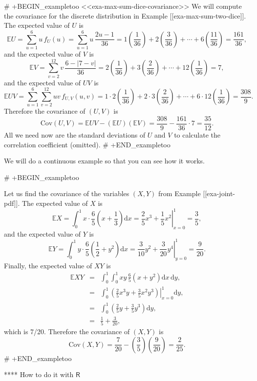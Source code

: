# +BEGIN_exampletoo
<<exa-max-sum-dice-covariance>> We will compute the covariance for the
discrete distribution in Example [[exa-max-sum-two-dice]]. The expected
value of \(U\) is \[ \mathbb{E} U=\sum_{u=1}^{6}u\,
f_{U}(u)=\sum_{u=1}^{6}u\,\frac{2u-1}{36}=1\left(\frac{1}{36}\right)+2\left(\frac{3}{36}\right)+\cdots+6\left(\frac{11}{36}\right)=\frac{161}{36},
\] and the expected value of \(V\) is \[ \mathbb{E}
V=\sum_{v=2}^{12}v\,\frac{6-|7-v|}{36}=2\left(\frac{1}{36}\right)+3\left(\frac{2}{36}\right)+\cdots+12\left(\frac{1}{36}\right)=7,
\] and the expected value of \(UV\) is \[ \mathbb{E}
UV=\sum_{u=1}^{6}\sum_{v=2}^{12}uv\,
f_{U,V}(u,v)=1\cdot2\left(\frac{1}{36}\right)+2\cdot3\left(\frac{2}{36}\right)+\cdots+6\cdot12\left(\frac{1}{36}\right)=\frac{308}{9}.
\] Therefore the covariance of \((U,V)\) is \[
\mbox{Cov}(U,V)=\mathbb{E} UV-\left(\mathbb{E}
U\right)\left(\mathbb{E}
V\right)=\frac{308}{9}-\frac{161}{36}\cdot7=\frac{35}{12}.  \] All we
need now are the standard deviations of \(U\) and \(V\) to calculate
the correlation coefficient (omitted).
# +END_exampletoo


We will do a continuous example so that you can see how it works.

# +BEGIN_exampletoo


Let us find the covariance of the variables \((X,Y)\) from Example
[[exa-joint-pdf]]. The expected value of \(X\) is \[ \mathbb{E}
X=\int_{0}^{1}x\cdot\frac{6}{5}\left(x+\frac{1}{3}\right)\mathrm{d}
x=\left.\frac{2}{5}x^{3}+\frac{1}{5}x^{2}\right|_{x=0}^{1}=\frac{3}{5},
\] and the expected value of \(Y\) is \[ \mathbb{E}
Y=\int_{0}^{1}y\cdot\frac{6}{5}\left(\frac{1}{2}+y^{2}\right)\mathrm{d}
x=\left.\frac{3}{10}y^{2}+\frac{3}{20}y^{4}\right|_{y=0}^{1}=\frac{9}{20}.
\] Finally, the expected value of \(XY\) is
\begin{eqnarray*}
\mathbb{E} XY & = & \int_{0}^{1}\int_{0}^{1}xy\,\frac{6}{5}\left(x+y^{2}\right)\mathrm{d} x\,\mathrm{d} y,\\
 & = & \int_{0}^{1}\left.\left(\frac{2}{5}x^{3}y+\frac{3}{5}x^{2}y^{3}\right)\right|_{x=0}^{1}\mathrm{d} y,\\
 & = & \int_{0}^{1}\left(\frac{2}{5}y+\frac{3}{5}y^{3}\right)\mathrm{d} y,\\
 & = & \frac{1}{5}+\frac{3}{20},
\end{eqnarray*}
which is 7/20. Therefore the covariance of \((X,Y)\) is
\[
\mbox{Cov}(X,Y)=\frac{7}{20}-\left(\frac{3}{5}\right)\left(\frac{9}{20}\right)=\frac{2}{25}.
\]
# +END_exampletoo

**** How to do it with \(\mathsf{R}\)

